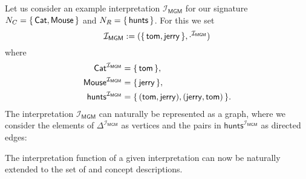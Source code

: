 \begin{Example}
  \label{expl:tom-hunts-jerry-hunts-tom-interpretation}
  Let us consider an example interpretation $\mathcal{I}_{\mathsf{MGM}}$ for our signature
  $N_C = {\{\, \mathsf{Cat}, \mathsf{Mouse} \,\}}$ and $N_R = {\{\, \mathsf{hunts} \,\}}$.  For
  this we set
  \begin{equation*}
    \mathcal{I}_{\mathsf{MGM}} := ({\{\, \mathsf{tom}, \mathsf{jerry} \,\}}, \cdot^{\mathcal{I}_{\mathsf{MGM}}})
  \end{equation*}
  where
  \begin{align*}
    \mathsf{Cat}^{\mathcal{I}_{\mathsf{MGM}}} &= {\{\, \mathsf{tom} \,\}}, \\
    \mathsf{Mouse}^{\mathcal{I}_{\mathsf{MGM}}} &= {\{\, \mathsf{jerry} \,\}}, \\
    \mathsf{hunts}^{\mathcal{I}_{\mathsf{MGM}}} &= {\{\, (\mathsf{tom}, \mathsf{jerry}),
      (\mathsf{jerry}, \mathsf{tom}) \,\}}.
  \end{align*}
  The interpretation $\mathcal{I}_{\mathsf{MGM}}$ can naturally be represented as a graph,
  where we consider the elements of $\Delta^{\mathcal{I}_{\mathsf{MGM}}}$ as vertices and
  the pairs in $\mathsf{hunts}^{\mathcal{I}_{\mathsf{MGM}}}$ as directed edges:
  \begin{center}
  \end{center}
\end{Example}

The interpretation function of a given interpretation can now be naturally extended to the
set of \EL and \ELbot concept descriptions.


